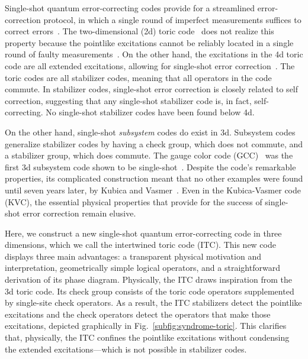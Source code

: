 Single-shot quantum error-correcting codes provide for a streamlined error-correction protocol, in which a single round of imperfect measurements suffices to correct errors~\cite{Bombin2015SingleShot}. The two-dimensional (2d) toric code~\cite{Kitaev2003Fault} does not realize this property because the pointlike excitations cannot be reliably located in a single round of faulty measurements~\cite{Dennis2002Topological}. On the other hand, the excitations in the 4d toric code are all extended excitations, allowing for single-shot error correction~\cite{Dennis2002Topological}. The toric codes are all stabilizer codes, meaning that all operators in the code commute. In stabilizer codes, single-shot error correction is closely related to self correction, suggesting that any single-shot stabilizer code is, in fact, self-correcting. No single-shot stabilizer codes have been found below 4d.

On the other hand, single-shot \emph{subsystem} codes do exist in 3d.
Subsystem codes generalize stabilizer codes by having a check group, which does not commute, and a stabilizer group, which does commute.
The gauge color code (GCC)~\cite{Bombin2015Gauge} was the first 3d subsystem code shown to be single-shot~\cite{Bombin2015SingleShot}. Despite the code's remarkable properties, its complicated construction meant that no other examples were found until seven years later, by Kubica and Vasmer~\cite{KubicaVasmer2022}. Even in the Kubica-Vasmer code (KVC), the essential physical properties that provide for the success of single-shot error correction remain elusive. 

Here, we construct a new single-shot quantum error-correcting code in three dimensions, which we call the intertwined toric code (ITC). This new code displays three main advantages: a transparent physical motivation and interpretation, geometrically simple logical operators, and a straightforward derivation of its phase diagram.
Physically, the ITC draws inspiration from the 3d toric code. Its check group consists of the toric code operators supplemented by single-site check operators. As a result, the ITC stabilizers detect the pointlike excitations and the check operators detect the operators that make those excitations, depicted graphically in Fig.~\ref{subfig:syndrome-toric}. This clarifies that, physically, the ITC confines the pointlike excitations without condensing the extended excitations---which is not possible in stabilizer codes. 

